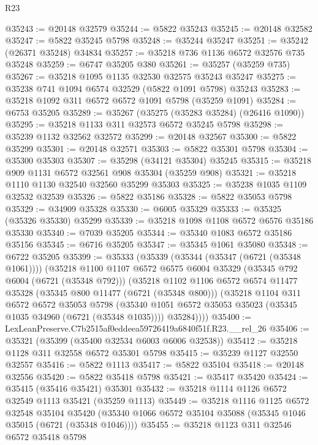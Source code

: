 \begin{lexlean}{R23}
\begin{coremodule}
@35243 := @20148 @32579
@35244 := @5822 @35243
@35245 := @20148 @32582
@35247 := @5822 @35245 @5798
@35248 := @35244 @35247
@35251 := @35242 (@26371 @35248) @34834
@35257 := @35218 @736 @1136 @6572 @32576 @735 @35248
@35259 := @6747 @35205 @380
@35261 := @35257 (@35259 @735)
@35267 := @35218 @1095 @1135 @32530 @32575 @35243 @35247
@35275 := @35238 @741 @1094 @6574 @32529 (@5822 @1091 @5798) @35243
@35283 := @35218 @1092 @311 @6572 @6572 @1091 @5798 (@35259 @1091)
@35284 := @6753 @35205
@35289 := @35267 (@35275 (@35283 @35284) (@26416 @1090))
@35295 := @35218 @1133 @311 @32573 @6572 @35245 @5798
@35298 := @35239 @1132 @32562 @32572
@35299 := @20148 @32567
@35300 := @5822 @35299
@35301 := @20148 @32571
@35303 := @5822 @35301 @5798
@35304 := @35300 @35303
@35307 := @35298 (@34121 @35304) @35245
@35315 := @35218 @909 @1131 @6572 @32561 @908 @35304 (@35259 @908)
@35321 := @35218 @1110 @1130 @32540 @32560 @35299 @35303
@35325 := @35238 @1035 @1109 @32532 @32539
@35326 := @5822 @35186
@35328 := @5822 @35053 @5798
@35329 := @34909 @35328
@35330 := @6005 @35329
@35333 := @35325 (@35326 @35330) @35299
@35339 := @35218 @1098 @1108 @6572 @6576 @35186 @35330
@35340 := @7039 @35205
@35344 := @35340 @1083 @6572 @35186 @35156
@35345 := @6716 @35205
@35347 := @35345 @1061 @35080
@35348 := @6722 @35205
@35399 := @35333
    (@35339
      (@35344 (@35347 (@6721 (@35348 @1061))))
      (@35218
        @1100
        @1107
        @6572
        @6575
        @6004
        @35329
        (@35345 @792 @6004 (@6721 (@35348 @792)))
        (@35218
          @1102
          @1106
          @6572
          @6574
          @11477
          @35328
          (@35345 @800 @11477 (@6721 (@35348 @800)))
          (@35218
            @1104
            @311
            @6572
            @6572
            @35053
            @5798
            (@35340 @1051 @6572 @35053 @35023 (@35345 @1035 @34960 (@6721 (@35348 @1035))))
            @35284))))
@35400 := LexLeanPreserve.C7b2515af0eddeea59726419a6840f51f.R23.__rel_26
@35406 := @35321 (@35399 (@35400 @32534 @6003 @6006 @32538))
@35412 := @35218 @1128 @311 @32558 @6572 @35301 @5798
@35415 := @35239 @1127 @32550 @32557
@35416 := @5822 @1113
@35417 := @5822 @35104
@35418 := @20148 @32556
@35420 := @5822 @35418 @5798
@35421 := @35417 @35420
@35424 := @35415 (@35416 @35421) @35301
@35432 := @35218 @1114 @1126 @6572 @32549 @1113 @35421 (@35259 @1113)
@35449 := @35218
    @1116
    @1125
    @6572
    @32548
    @35104
    @35420
    (@35340 @1066 @6572 @35104 @35088 (@35345 @1046 @35015 (@6721 (@35348 @1046))))
@35455 := @35218 @1123 @311 @32546 @6572 @35418 @5798

\end{coremodule}
\end{lexlean}

